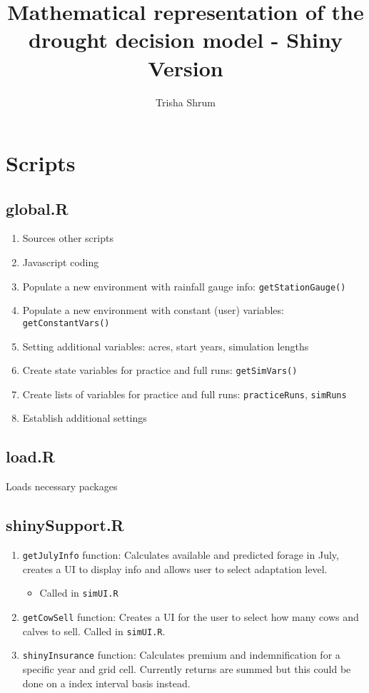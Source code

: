 \documentclass[11pt]{article}
\title{Mathematical representation of the drought decision model - Shiny Version}
\author{Trisha Shrum}
\begin{document}
\maketitle
 
\section{Scripts}

\subsection{global.R}
\begin{enumerate}
\item Sources other scripts
\item Javascript coding
\item Populate a new environment with rainfall gauge info: \verb!getStationGauge()!
\item Populate a new environment with constant (user) variables: \verb!getConstantVars()!
\item Setting additional variables: acres, start years, simulation lengths
\item Create state variables for practice and full runs: \verb!getSimVars()!
\item Create lists of variables for practice and full runs: \verb!practiceRuns!, \verb!simRuns!
\item Establish additional settings
\end{enumerate}  
 
\subsection{load.R}
Loads necessary packages

\subsection{shinySupport.R}
\begin{enumerate}
\item \verb!getJulyInfo! function: Calculates available and predicted forage in July, creates a
    UI to display info and allows user to select adaptation level.
    \begin{itemize}
    \item Called in \verb!simUI.R!
    \end{itemize}
\item \verb!getCowSell! function: Creates a UI for the user to select how many cows and calves to sell. Called in \verb!simUI.R!.
\item \verb!shinyInsurance! function: Calculates premium and indemnification for a specific year and
  grid cell. Currently returns are summed but this could be done on a index interval basis instead.
\end{enumerate}
\end{document}
